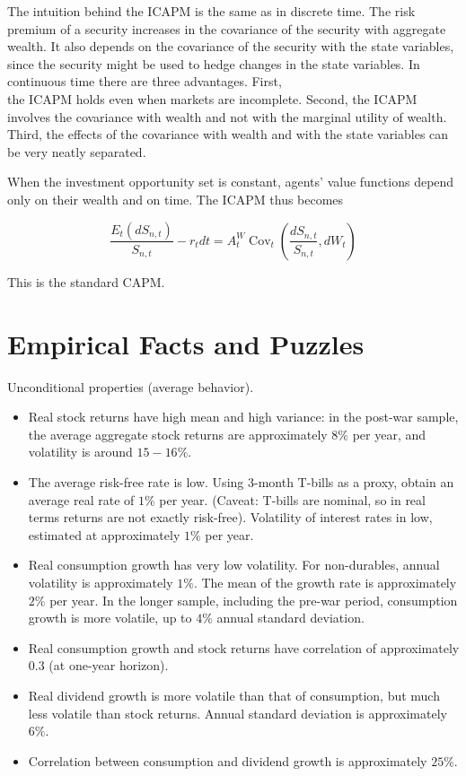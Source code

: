 \documentclass[\topdir/lecture\_notes.tex]{subfiles}
\begin{document}
The intuition behind the ICAPM is the same as in discrete time. The risk premium of a security increases in the covariance of the security with aggregate wealth. It also depends on the covariance of the security with the state variables, since the security might be used to hedge changes in the state variables. In continuous time there are three advantages. First,\\
the ICAPM holds even when markets are incomplete. Second, the ICAPM involves the covariance with wealth and not with the marginal utility of wealth. Third, the effects of the covariance with wealth and with the state variables can be very neatly separated.

When the investment opportunity set is constant, agents' value functions depend only on their wealth and on time. The ICAPM thus becomes

\begin{equation}
\frac{E_{t}\left(d S_{n, t}\right)}{S_{n, t}}-r_{t} d t=A_{t}^{W} \operatorname{Cov}_{t}\left(\frac{d S_{n, t}}{S_{n, t}}, d W_{t}\right) \label{eq:8.2.15}
\end{equation}

This is the standard CAPM.


\section{Empirical Facts and Puzzles}


Unconditional properties (average behavior).

\begin{itemize}
  \item Real stock returns have high mean and high variance: in the post-war sample, the average aggregate stock returns are approximately \(8 \%\) per year, and volatility is around \(15-16 \%\).
  \item The average risk-free rate is low. Using 3-month T-bills as a proxy, obtain an average real rate of \(1 \%\) per year. (Caveat: T-bills are nominal, so in real terms returns are not exactly risk-free). Volatility of interest rates in low, estimated at approximately \(1 \%\) per year.
  \item Real consumption growth has very low volatility. For non-durables, annual volatility is approximately \(1 \%\). The mean of the growth rate is approximately \(2 \%\) per year. In the longer sample, including the pre-war period, consumption growth is more volatile, up to \(4 \%\) annual standard deviation.
  \item Real consumption growth and stock returns have correlation of approximately 0.3 (at one-year horizon).
  \item Real dividend growth is more volatile than that of consumption, but much less volatile than stock returns. Annual standard deviation is approximately \(6 \%\).
  \item Correlation between consumption and dividend growth is approximately \(25 \%\).
\end{itemize}
\end{document}
